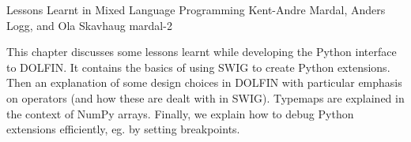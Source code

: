               {Lessons Learnt in Mixed Language Programming}
              {Kent-Andre Mardal, Anders Logg, and Ola Skavhaug}
              {mardal-2}


This chapter discusses some lessons learnt while developing the Python
interface to DOLFIN. It contains the basics of using SWIG to create
Python extensions. Then an explanation of some design choices in
DOLFIN with particular emphasis on operators (and how these are dealt
with in SWIG). Typemaps are explained in the context of NumPy arrays.
Finally, we explain how to debug Python extensions efficiently, eg. by
setting breakpoints.
